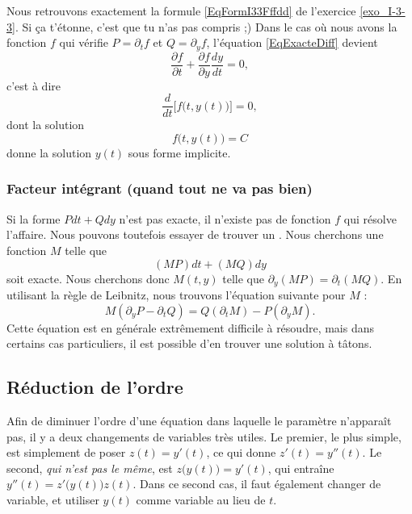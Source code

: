 Nous retrouvons exactement la formule \eqref{EqFormI33Fffdd} de l'exercice \ref{exo_I-3-3}. Si ça t'étonne, c'est que tu n'as pas compris ;) Dans le cas où nous avons la fonction $f$ qui vérifie $P=\partial_tf$ et $Q=\partial_yf$, l'équation \eqref{EqExacteDiff} devient
\begin{equation}
	\frac{ \partial f }{ \partial t }+\frac{ \partial f }{ \partial y }\frac{ dy }{ dt }=0,
\end{equation}
c'est à dire 
\begin{equation}
	\frac{ d }{ dt }\Big[ f\big( t,y(t) \big) \Big]=0,
\end{equation}
dont la solution
\begin{equation}
	f\big( t,y(t) \big)=C
\end{equation}
donne la solution $y(t)$ sous forme implicite.

					\subsubsection{Facteur intégrant (quand tout ne va pas bien)}

Si la forme $Pdt+Qdy$ n'est pas exacte, il n'existe pas de fonction $f$ qui résolve l'affaire. Nous pouvons toutefois essayer de trouver un . Nous cherchons une fonction $M$ telle que
\begin{equation}
	(MP)dt+(MQ)dy
\end{equation}
soit exacte. Nous cherchons donc $M(t,y)$ telle que $\partial_y(MP)=\partial_t(MQ)$. En utilisant la règle de Leibnitz, nous trouvons l'équation suivante pour $M$ :
\begin{equation}		\label{EqDuFacteurIntegrant}
	M(\partial_yP-\partial_tQ)=Q(\partial_tM)-P(\partial_yM).
\end{equation}
Cette équation est en générale extrêmement difficile à résoudre, mais dans certains cas particuliers, il est possible d'en trouver une solution à tâtons.

					\subsection{Réduction de l'ordre}

Afin de diminuer l'ordre d'une équation dans laquelle le paramètre n'apparaît pas, il y a deux changements de variables très utiles. Le premier, le plus simple, est simplement de poser $z(t)=y'(t)$, ce qui donne $z'(t)=y''(t)$. Le second, \emph{qui n'est pas le même}, est $z\big( y(t) \big)=y'(t)$, qui entraîne $y''(t)=z'\big( y(t) \big)z(t)$. Dans ce second cas, il faut également changer de variable, et utiliser $y(t)$ comme variable au lieu de $t$.

